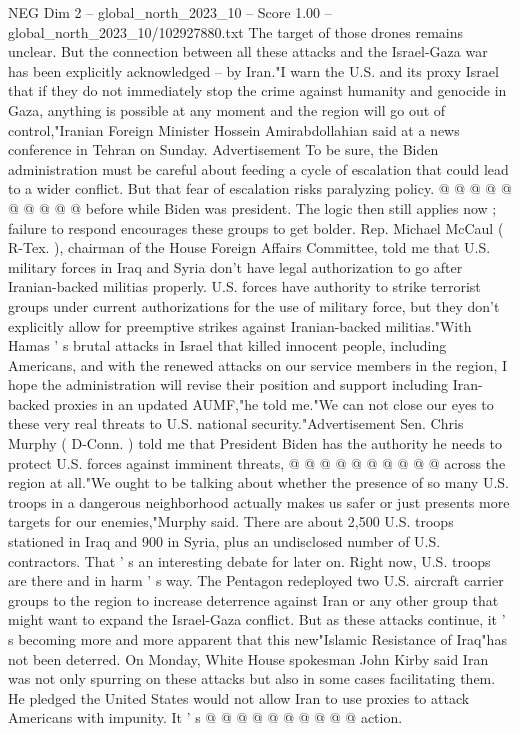 \begin{textsample}{NEG Dim 2 – global\_north\_2023\_10 – Score 1.00 – global\_north\_2023\_10/102927880.txt}
The target of those drones remains unclear.
But the connection between all these attacks and the Israel-Gaza war has been explicitly acknowledged -- by Iran."I warn the U.S. and its proxy Israel that if they do not immediately stop the crime against humanity and genocide in Gaza, anything is possible at any moment and the region will go out of control,"Iranian Foreign Minister Hossein Amirabdollahian said at a news conference in Tehran on Sunday.
Advertisement To be sure, the Biden administration must be careful about feeding a cycle of escalation that could lead to a wider conflict.
But that fear of escalation risks paralyzing policy. @ @ @ @ @ @ @ @ @ @ before while Biden was president.
The logic then still applies now ; failure to respond encourages these groups to get bolder.
Rep.
Michael McCaul ( R-Tex. ), chairman of the House Foreign Affairs Committee, told me that U.S. military forces in Iraq and Syria don't have legal authorization to go after Iranian-backed militias properly.
U.S. forces have authority to strike terrorist groups under current authorizations for the use of military force, but they don't explicitly allow for preemptive strikes against Iranian-backed militias."With Hamas ' s brutal attacks in Israel that killed innocent people, including Americans, and with the renewed attacks on our service members in the region, I hope the administration will revise their position and support including Iran-backed proxies in an updated AUMF,"he told me."We can not close our eyes to these very real threats to U.S. national security."Advertisement Sen.
Chris Murphy ( D-Conn. ) told me that President Biden has the authority he needs to protect U.S. forces against imminent threats, @ @ @ @ @ @ @ @ @ @ across the region at all."We ought to be talking about whether the presence of so many U.S. troops in a dangerous neighborhood actually makes us safer or just presents more targets for our enemies,"Murphy said.
There are about 2,500 U.S. troops stationed in Iraq and 900 in Syria, plus an undisclosed number of U.S. contractors.
That ' s an interesting debate for later on.
Right now, U.S. troops are there and in harm ' s way.
The Pentagon redeployed two U.S. aircraft carrier groups to the region to increase deterrence against Iran or any other group that might want to expand the Israel-Gaza conflict.
But as these attacks continue, it ' s becoming more and more apparent that this new"Islamic Resistance of Iraq"has not been deterred.
On Monday, White House spokesman John Kirby said Iran was not only spurring on these attacks but also in some cases facilitating them.
He pledged the United States would not allow Iran to use proxies to attack Americans with impunity.
It ' s @ @ @ @ @ @ @ @ @ @ action.

\end{textsample}
